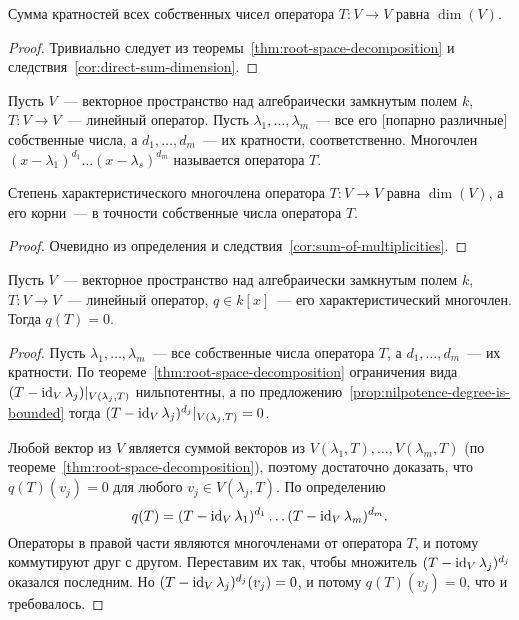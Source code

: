 \begin{corollary}\label{cor:sum-of-multiplicities}
Сумма кратностей всех собственных чисел оператора $T\colon V\to V$ равна $\dim(V)$.
\end{corollary}
\begin{proof}
Тривиально следует из теоремы~\ref{thm:root-space-decomposition}
и следствия~\ref{cor:direct-sum-dimension}.
\end{proof}

\begin{definition}
Пусть $V$~--- векторное пространство над алгебраически замкнутым полем $k$,
$T\colon V\to V$~--- линейный оператор. Пусть $\lambda_1,\dots,\lambda_m$~--- все его
[попарно различные] собственные числа, а $d_1,\dots,d_m$~--- их кратности, соответственно.
Многочлен $(x-\lambda_1)^{d_1}\dots(x-\lambda_s)^{d_m}$ называется
 оператора $T$.
\end{definition}
\begin{proposition}\label{prop:degree-and-roots-of-char-poly}
Степень характеристического многочлена оператора $T\colon V\to V$ равна $\dim(V)$,
а его корни~--- в точности собственные числа оператора $T$.
\end{proposition}
\begin{proof}
Очевидно из определения и следствия~\ref{cor:sum-of-multiplicities}.
\end{proof}

\begin{theorem}\label{thm:cayley-hamilton}
Пусть $V$~--- векторное пространство над алгебраически замкнутым полем $k$,
$T\colon V\to V$~--- линейный оператор, $q\in k[x]$~--- его характеристический многочлен.
Тогда $q(T) = 0$.
\end{theorem}
\begin{proof}
Пусть $\lambda_1,\dots,\lambda_m$~--- все собственные числа оператора $T$,
а $d_1,\dots,d_m$~--- их кратности. По теореме~\ref{thm:root-space-decomposition}
ограничения вида $(T-\operatorname{id}_V\lambda_j)|_{V(\lambda_j,T)}$ нильпотентны,
а по предложению~\ref{prop:nilpotence-degree-is-bounded} тогда
$(T-\operatorname{id}_V\lambda_j)^{d_j}|_{V(\lambda_j,T)} = 0$.

Любой вектор из $V$ является суммой векторов из $V(\lambda_1,T),\dots,V(\lambda_m,T)$
(по теореме~\ref{thm:root-space-decomposition}), поэтому достаточно доказать,
что $q(T)(v_j)=0$ для любого $v_j\in V(\lambda_j,T)$.
По определению
$$
q(T) = (T-\operatorname{id}_V\lambda_1)^{d_1}\dots (T-\operatorname{id}_V\lambda_m)^{d_m}.
$$
Операторы в правой части являются многочленами от оператора $T$, и потому коммутируют
друг с другом. Переставим их так, чтобы множитель $(T-\operatorname{id}_V\lambda_j)^{d_j}$ оказался
последним. Но $(T-\operatorname{id}_V\lambda_j)^{d_j}(v_j)=0$, и потому $q(T)(v_j)=0$,
что и требовалось.
\end{proof}

